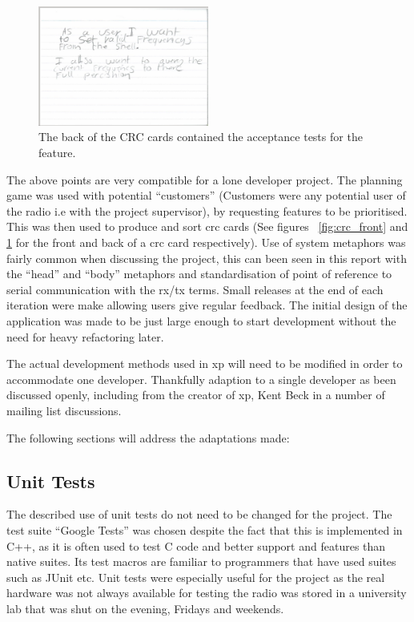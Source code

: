 \begin{figure}
    \centering
    \includegraphics[width=0.5\textwidth]{img/crc_back}
    \caption[CRC back]{The back of the CRC cards contained the acceptance tests for the feature.}
    \label{fig:crc_back}
\end{figure}

The above points are very compatible for a lone developer project. The planning game was used with potential ``customers'' (Customers were any potential user of the radio i.e with the project supervisor), by requesting features to be prioritised. This was then used to produce and sort \gls{crc} cards (See figures ~\ref{fig:crc_front} and \ref{fig:crc_back} for the front and back of a \gls{crc} card respectively). Use of system metaphors was fairly common when discussing the project, this can been seen in this report with the ``head'' and ``body'' metaphors and standardisation of point of reference to serial communication with the \gls{rx}/\gls{tx} terms. Small releases at the end of each iteration were make allowing users give regular feedback. The initial design of the application was made to be just large enough to start development without the need for heavy refactoring later.

The actual development methods used in \gls{xp} will need to be modified in order to accommodate one developer. Thankfully adaption to a single developer as been discussed openly, including from the creator of \gls{xp}, Kent Beck in a number of mailing list discussions\cite{xpforone}\cite{lone_developer}.

The following sections will address the adaptations made:
\subsection*{Unit Tests}
The described use of unit tests do not need to be changed for the project. The test suite ``Google Tests''\cite{google_tests} was chosen despite the fact that this is implemented in C++, as it is often used to test C code and better support and features than native suites. Its test macros are familiar to programmers that have used suites such as JUnit etc. Unit tests were especially useful for the project as the real hardware was not always available for testing the radio was stored in a university lab that was shut on the evening, Fridays and weekends. 

